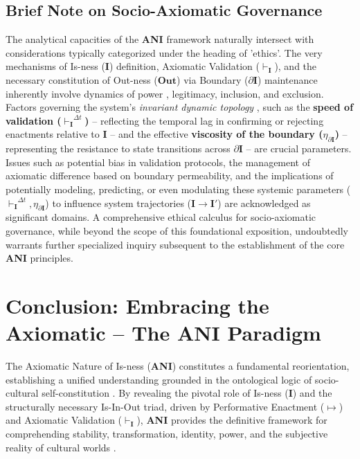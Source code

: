 \documentclass{article}
\newcommand{\ANI}{\textbf{ANI}}             %
\newcommand{\Isness}{\mathbf{I}}            %
\newcommand{\Outness}{\mathbf{Out}}         %
\newcommand{\enactment}{\ensuremath{\mapsto}} %
\newcommand{\validates}[1]{\ensuremath{\vdash_{#1}}} %
\newcommand{\boundary}[1]{\ensuremath{\partial #1}} %
\begin{document}
\subsection{Brief Note on Socio-Axiomatic Governance}

The analytical capacities of the \ANI{} framework naturally intersect with considerations typically categorized under the heading of 'ethics'. The very mechanisms of Is-ness ($\Isness$) definition, Axiomatic Validation ($\validates{\Isness}$), and the necessary constitution of Out-ness ($\Outness$) via Boundary ($\boundary{\Isness}$) maintenance inherently involve dynamics of power \citep{Foucault1972}, legitimacy, inclusion, and exclusion. Factors governing the system's \textit{invariant dynamic topology} \citep{Luhmann1995}, such as the \textbf{speed of validation ($\validates{\Isness}^{\Delta t}$)} – reflecting the temporal lag in confirming or rejecting enactments relative to $\Isness$ – and the effective \textbf{viscosity of the boundary ($\eta_{\boundary{\Isness}}$)} – representing the resistance to state transitions across $\boundary{\Isness}$ – are crucial parameters. Issues such as potential bias in validation protocols, the management of axiomatic difference based on boundary permeability, and the implications of potentially modeling, predicting, or even modulating these systemic parameters ($\validates{\Isness}^{\Delta t}, \eta_{\boundary{\Isness}}$) to influence system trajectories ($\Isness \rightarrow \Isness'$) are acknowledged as significant domains. A comprehensive ethical calculus for socio-axiomatic governance, while beyond the scope of this foundational exposition, undoubtedly warrants further specialized inquiry subsequent to the establishment of the core \ANI{} principles.

\section{Conclusion: Embracing the Axiomatic – The ANI Paradigm}

The Axiomatic Nature of Is-ness (\ANI{}) constitutes a fundamental reorientation, establishing a unified understanding grounded in the ontological logic of socio-cultural self-constitution \citep{BergerLuckmann1966, Searle1995}. By revealing the pivotal role of Is-ness ($\Isness$) and the structurally necessary Is-In-Out triad, driven by Performative Enactment ($\enactment$) and Axiomatic Validation ($\validates{\Isness}$), \ANI{} provides the definitive framework for comprehending stability, transformation, identity, power, and the subjective reality of cultural worlds \citep{Schutz1967}.
\end{document}
